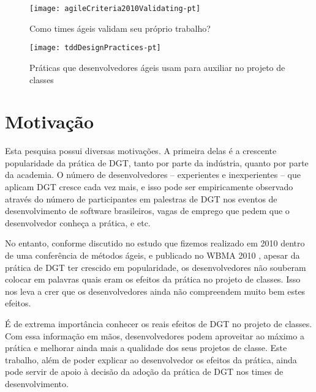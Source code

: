\begin{figure}[ht]
  \begin{minipage}[b]{0.45\linewidth}
    \centering
    \texttt{[image: agileCriteria2010Validating-pt]}
    \caption{Como times ágeis validam seu próprio trabalho?}
    \label{fig:wambler-agile-2010}
  \end{minipage}
  \hspace{0.5cm}
  \begin{minipage}[b]{0.45\linewidth}
    \centering
    \texttt{[image: tddDesignPractices-pt]}
    \caption{Práticas que desenvolvedores ágeis usam para auxiliar no projeto de classes}  
    \label{fig:wambler-tdd-2008}
  \end{minipage}
\end{figure}			

\section{Motivação}

Esta pesquisa possui diversas motivações. A primeira delas é a crescente
popularidade da prática de DGT, tanto por parte da indústria, quanto 
por parte da academia. O número de desenvolvedores -- experientes e inexperientes --
que aplicam DGT cresce cada vez mais, e isso pode ser empiricamente
observado através do número de participantes em palestras de DGT nos
eventos de desenvolvimento de software brasileiros, vagas de emprego
que pedem que o desenvolvedor conheça a prática, e etc.

No entanto, conforme discutido no estudo que fizemos 
realizado em 2010 dentro de uma conferência de 
métodos ágeis, e publicado no WBMA 2010 \cite{aniche-wbma}, apesar da prática de 
DGT ter crescido em popularidade, os desenvolvedores não souberam
colocar em palavras quais eram os efeitos da prática no projeto de classes.
Isso nos leva a crer que os desenvolvedores ainda 
não compreendem muito bem estes efeitos.

É de extrema importância conhecer os reais efeitos de DGT no projeto de classes. Com essa
informação em mãos, desenvolvedores podem aproveitar ao máximo
a prática e melhorar ainda mais a qualidade dos seus projetos
de classe. 
Este trabalho, além de poder explicar ao desenvolvedor os efeitos
da prática, ainda pode servir de apoio à decisão da adoção da prática
de DGT nos times de desenvolvimento.

